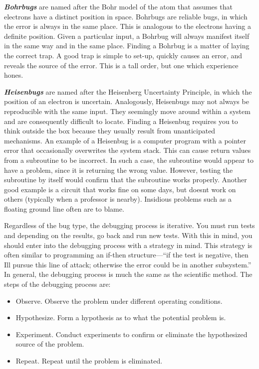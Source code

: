 \emph{\textbf{Bohrbugs}} are named after the Bohr model of the atom that
assumes that electrons have a distinct position in space. Bohrbugs are
reliable bugs, in which the error is always in the same place. This is
analogous to the electrons having a definite position. Given a
particular input, a Bohrbug will always manifest itself in the same way
and in the same place. Finding a Bohrbug is a matter of laying the
correct trap. A good trap is simple to set-up, quickly causes an error,
and reveals the source of the error. This is a tall order, but one which
experience hones.

\emph{\textbf{Heisenbugs}} are named after the Heisenberg Uncertainty
Principle, in which the position of an electron is uncertain.
Analogously, Heisenbugs may not always be reproducible with the same
input. They seemingly move around within a system and are consequently
difficult to locate. Finding a Heisenbug requires you to think outside
the box because they usually result from unanticipated mechanisms. An
example of a Heisenbug is a computer program with a pointer error that
occasionally overwrites the system stack. This can cause return values
from a subroutine to be incorrect. In such a case, the subroutine would
appear to have a problem, since it is returning the wrong value.
However, testing the subroutine by itself would confirm that the
subroutine works properly. Another good example is a circuit that works
fine on some days, but doesn\textquotesingle t work on others (typically
when a professor is nearby). Insidious problems such as a floating
ground line often are to blame.

Regardless of the bug type, the debugging process is iterative. You must
run tests and depending on the results, go back and run new tests. With
this in mind, you should enter into the debugging process with a
strategy in mind. This strategy is often similar to programming an
if-then structure---``if the test is negative, then I\textquotesingle ll
pursue this line of attack; otherwise the error could be in another
subsystem.'' In general, the debugging process is much the same as the
scientific method. The steps of the debugging process are:

\begin{itemize}
\item
  Observe. Observe the problem under different operating conditions.
\item
  Hypothesize. Form a hypothesis as to what the potential problem is.
\item
  Experiment. Conduct experiments to confirm or eliminate the
  hypothesized source of the problem.
\item
  Repeat. Repeat until the problem is eliminated.
\end{itemize}

